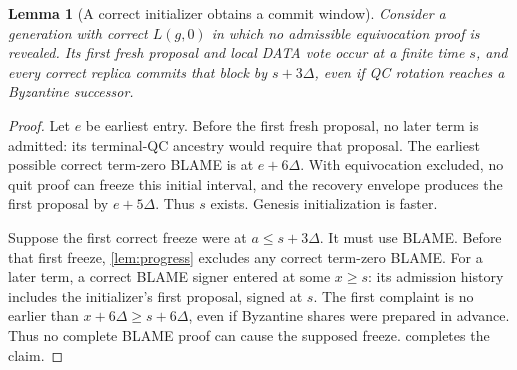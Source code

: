 \documentclass[11pt,a4paper]{article}
\newtheorem{lemma}[lemma]{Lemma}
\begin{document}
\begin{lemma}[A correct initializer obtains a commit window]
\label{lem:initializer}
Consider a generation with correct $L(g,0)$ in which no admissible
equivocation proof is revealed. Its first fresh proposal and local DATA
vote occur at a finite time $s$, and every correct replica commits that block by
$s+3\Delta$, even if QC rotation reaches a Byzantine successor.
\end{lemma}
\begin{proof}
Let $e$ be earliest entry. Before the first fresh proposal, no later
term is admitted: its terminal-QC ancestry would require that proposal.
The earliest possible correct term-zero BLAME is at $e+6\Delta$.
With equivocation excluded, no quit proof can freeze this initial interval,
and the recovery envelope produces the first proposal by $e+5\Delta$.
Thus $s$ exists. Genesis initialization is faster.

Suppose the first correct freeze were at $a\le s+3\Delta$.
It must use BLAME. Before that first freeze, \cref{lem:progress} excludes
any correct term-zero BLAME. For a later term, a correct BLAME signer
entered at some $x\ge s$: its admission history includes the initializer's
first proposal, signed at $s$. The first complaint is no earlier than
$x+6\Delta\ge s+6\Delta$, even if Byzantine shares were prepared in
advance. Thus no complete BLAME proof can cause the supposed freeze.
 completes the claim.
\end{proof}
\end{document}
